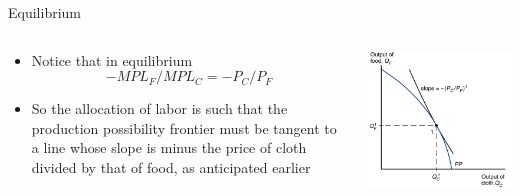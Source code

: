 \documentclass[10pt,hyperref={CJKbookmarks=true},xcolor=dvipsnames,aspectratio=169]{beamer}
\begin{document}
\begin{frame}{Equilibrium }


\begin{columns}[onlytextwidth]
\begin{column}{0.4\textwidth}
\begin{itemize}
\item Notice that in equilibrium 
\[
-MPL_{F}/MPL_{C}=-P_{C}/P_{F}
\]

\item So the allocation of labor is such that the production possibility
frontier must be tangent to a line whose slope is minus the price
of cloth divided by that of food, as anticipated earlier 
\end{itemize}

\end{column}
\begin{column}{0.6\textwidth}
\centering \includegraphics[width=0.7\columnwidth]{fig/sfm/lec4-14}
\end{column}
\end{columns}

\end{frame}
\end{document}
